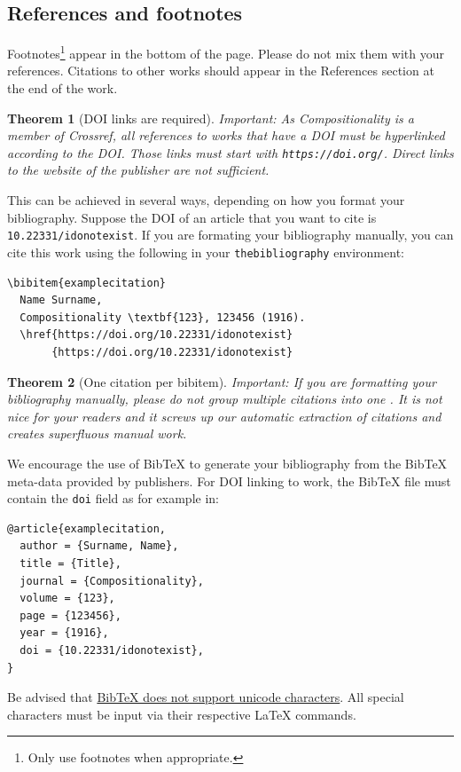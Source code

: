 \documentclass[a4paper,onecolumn,superscriptaddress,10pt,issue=1, volume=2, shorttitle=papers]{compositionalityarticle}
\newtheorem{theorem}{Theorem}
\begin{document}
\subsection{References and footnotes}
\label{sec:subsec1}
Footnotes\footnote{Only use footnotes when appropriate.} appear in the bottom of the page.
Please do not mix them with your references.
Citations to other works should appear in the References section at the end of the work.

\begin{theorem}[DOI links are required]
  Important: As Compositionality is a member of Crossref, all references to works that have a DOI must be hyperlinked according to the DOI. Those links must start with \texttt{https://doi.org/}. Direct links to the website of the publisher are not sufficient.
\end{theorem}

This can be achieved in several ways, depending on how you format your bibliography.
Suppose the DOI of an article \cite{examplecitation} that you want to cite is \texttt{10.22331/idonotexist}.
If you are formating your bibliography manually, you can cite this work using the following in your \texttt{thebibliography} environment:
\begin{verbatim}
\bibitem{examplecitation}
  Name Surname,
  Compositionality \textbf{123}, 123456 (1916).
  \href{https://doi.org/10.22331/idonotexist}
       {https://doi.org/10.22331/idonotexist}
\end{verbatim}

\begin{theorem}[One citation per bibitem]
  Important: If you are formatting your bibliography manually, please do not group multiple citations into one \texttt{\string\bibitem}.
  It is not nice for your readers and it screws up our automatic extraction of citations and creates superfluous manual work.
\end{theorem}

We encourage the use of BibTeX to generate your bibliography from the BibTeX meta-data provided by publishers.
For DOI linking to work, the BibTeX file must contain the \texttt{doi} field as for example in:
\begin{verbatim}
@article{examplecitation,
  author = {Surname, Name},
  title = {Title},
  journal = {Compositionality},
  volume = {123},
  page = {123456},
  year = {1916},
  doi = {10.22331/idonotexist},
}
\end{verbatim}

Be advised that \href{http://wiki.lyx.org/BibTeX/Tips}{BibTeX does not support unicode characters}.
All special characters must be input via their respective LaTeX commands.
\end{document}
